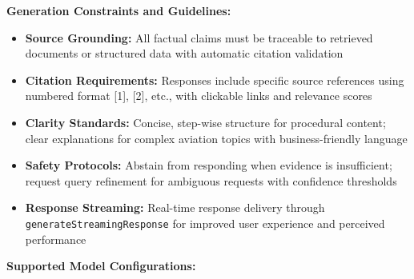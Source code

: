 \textbf{Generation Constraints and Guidelines:}
\begin{itemize}
    \item \textbf{Source Grounding:} All factual claims must be traceable to retrieved documents or structured data with automatic citation validation
    \item \textbf{Citation Requirements:} Responses include specific source references using numbered format [1], [2], etc., with clickable links and relevance scores
    \item \textbf{Clarity Standards:} Concise, step-wise structure for procedural content; clear explanations for complex aviation topics with business-friendly language
    \item \textbf{Safety Protocols:} Abstain from responding when evidence is insufficient; request query refinement for ambiguous requests with confidence thresholds
    \item \textbf{Response Streaming:} Real-time response delivery through \texttt{generateStreamingResponse} for improved user experience and perceived performance
\end{itemize}

\textbf{Supported Model Configurations:}
\begin{table}[H]
\centering
\caption{Model server configurations and specializations in AirportRAG}
\label{tab:model_specs_s2}
\end{table}

